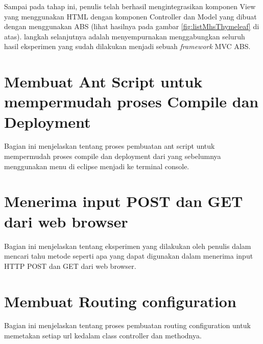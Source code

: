 Sampai pada tahap ini, penulis telah berhasil mengintegrasikan komponen View yang menggunakan HTML dengan komponen Controller dan Model yang dibuat dengan menggunakan ABS (lihat hasilnya pada gambar \ref{fig:listMhsThymeleaf} di atas). langkah selanjutnya adalah menyempurnakan menggabungkan seluruh hasil eksperimen yang sudah dilakukan menjadi sebuah \textit{framework} MVC ABS.

\section{Membuat Ant Script untuk mempermudah proses Compile dan Deployment}
Bagian ini menjelaskan tentang proses pembuatan ant script untuk mempermudah proses compile dan deployment dari yang sebelumnya menggunakan menu di eclipse menjadi ke terminal console.

\section{Menerima input POST dan GET dari web browser}
Bagian ini menjelaskan tentang eksperimen yang dilakukan oleh penulis dalam mencari tahu metode seperti apa yang dapat digunakan dalam menerima input HTTP POST dan GET dari web browser.

\section{Membuat Routing configuration}
Bagian ini menjelaskan tentang proses pembuatan routing configuration untuk memetakan setiap url kedalam class controller dan methodnya.